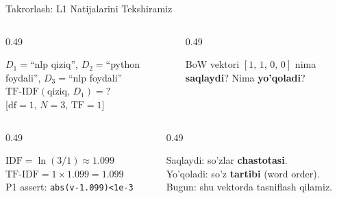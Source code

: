 \documentclass[aspectratio=169,11pt]{beamer}
\begin{document}
\begin{frame}{Takrorlash: L1 Natijalarini Tekshiramiz}
  \begin{columns}[T]
    \begin{column}{0.49\textwidth}
      \begin{tcolorbox}[warnbox,title=Savol 1]
        \small
        $D_1{=}$``nlp qiziq'',\; $D_2{=}$``python foydali'',\;
        $D_3{=}$``nlp foydali''\\[3pt]
        $\mathrm{TF\text{-}IDF}(\text{qiziq},\,D_1) = ?$\\
        \footnotesize [$\mathrm{df}=1$,\; $N=3$,\; $\mathrm{TF}=1$]
      \end{tcolorbox}
    \end{column}
    \begin{column}{0.49\textwidth}
      \begin{tcolorbox}[warnbox,title=Savol 2]
        \small
        BoW vektori $[1,\,1,\,0,\,0]$ nima
        \textbf{saqlaydi}?\; Nima \textbf{yo'qoladi}?
      \end{tcolorbox}
    \end{column}
  \end{columns}
  \pause
  \vspace{4pt}
  \begin{columns}[T]
    \begin{column}{0.49\textwidth}
      \begin{tcolorbox}[okbox,title=Javob 1]
        \small
        $\mathrm{IDF}=\ln(3/1)\approx 1.099$\\
        $\mathrm{TF\text{-}IDF}=1\times 1.099=\mathbf{1.099}$\\
        \footnotesize\textcolor{halfgray}{P1 assert: \texttt{abs(v-1.099)<1e-3}}
      \end{tcolorbox}
    \end{column}
    \begin{column}{0.49\textwidth}
      \begin{tcolorbox}[okbox,title=Javob 2]
        \small
        Saqlaydi: so'zlar \textbf{chastotasi}.\\
        Yo'qoladi: so'z \textbf{tartibi} (word order).\\
        \footnotesize\textcolor{halfgray}{Bugun: shu vektorda tasniflash qilamiz.}
      \end{tcolorbox}
    \end{column}
  \end{columns}
\end{frame}
\end{document}
